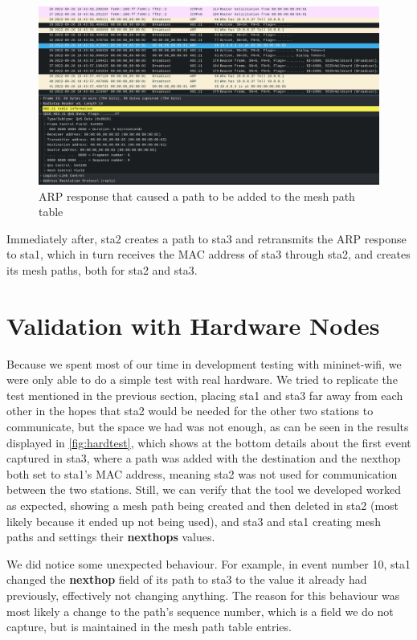 \begin{figure}[htb]
   \centering
   \includegraphics[scale=.35]{capsta3}
   \caption{ARP response that caused a path to be added to the mesh path table}\label{fig:capsta3}
\end{figure}

Immediately after, sta2 creates a path to sta3 and retransmits the ARP response
to sta1, which in turn receives the \ac{MAC} address of sta3 through sta2, and
creates its mesh paths, both for sta2 and sta3.


\section{Validation with Hardware Nodes}\label{sect:valid}

Because we spent most of our time in development testing with mininet-wifi, we
were only able to do a simple test with real hardware. We tried to replicate the
test mentioned in the previous section, placing sta1 and sta3 far away from each
other in the hopes that sta2 would be needed for the other two stations to
communicate, but the space we had was not enough, as can be seen in the results
displayed in \autoref{fig:hardtest}, which shows at the bottom details about the
first event captured in sta3, where a path was added with the destination and
the nexthop both set to sta1's \ac{MAC} address, meaning sta2 was not used for
communication between the two stations. Still, we can verify that the tool we
developed worked as expected, showing a mesh path being created and then deleted
in sta2 (most likely because it ended up not being used), and sta3 and sta1
creating mesh paths and settings their \textbf{nexthops} values.

We did notice some unexpected behaviour. For example, in event number 10, sta1
changed the \textbf{nexthop} field of its path to sta3 to the value it already
had previously, effectively not changing anything. The reason for this behaviour
was most likely a change to the path's sequence number, which is a field we do
not capture, but is maintained in the mesh path table entries.

